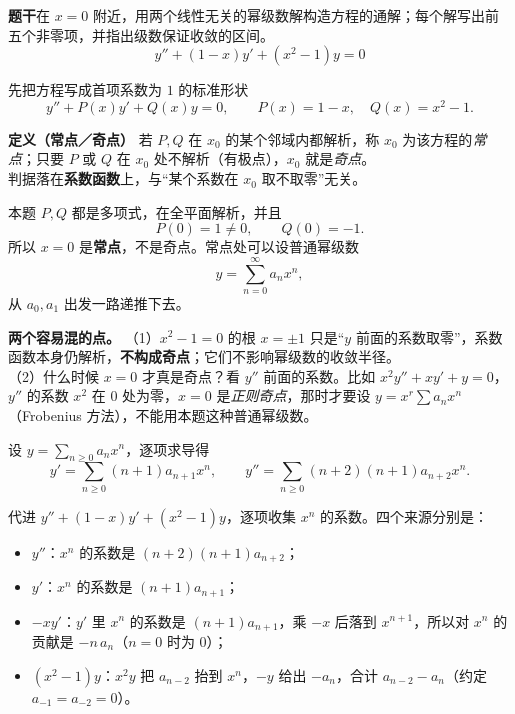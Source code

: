 ﻿\documentclass[11pt]{ctexart}
\renewcommand{\callout}[1]{\par\medskip\noindent
  \colorbox{bandviolet}{\parbox{0.955\linewidth}{\vspace{2pt}#1\vspace{2pt}}}%
  \par\medskip}
\renewcommand{\warnbox}[1]{\par\medskip\noindent
  \colorbox{bandcream}{\parbox{0.955\linewidth}{\vspace{2pt}#1\vspace{2pt}}}%
  \par\medskip}
\renewcommand{\qstem}[1]{\par\medskip\noindent
  \colorbox{bandviolet}{\parbox{0.955\linewidth}{\vspace{2pt}%
    {\small\bfseries\color{violet}题干}\hspace{0.8em}#1\vspace{2pt}}}%
  \par\medskip}
\begin{document}

\qstem{在 $x=0$ 附近，用两个线性无关的幂级数解构造方程的通解；每个解写出前五个非零项，并指出级数保证收敛的区间。
\[ y''+(1-x)y'+(x^2-1)y=0 \]}


先把方程写成首项系数为 $1$ 的标准形状
\[ y''+P(x)y'+Q(x)y=0,\qquad P(x)=1-x,\quad Q(x)=x^2-1 . \]

\callout{
\textbf{定义（常点／奇点）}\;
若 $P,Q$ 在 $x_0$ 的某个邻域内都解析，称 $x_0$ 为该方程的\emph{常点}；只要 $P$ 或 $Q$ 在 $x_0$ 处不解析（有极点），$x_0$ 就是\emph{奇点}。\\
判据落在\textbf{系数函数}上，与“某个系数在 $x_0$ 取不取零”无关。
}

本题 $P,Q$ 都是多项式，在全平面解析，并且
\[ P(0)=1\neq 0,\qquad Q(0)=-1 . \]
所以 $x=0$ 是\textbf{常点}，不是奇点。常点处可以设普通幂级数
\[ y=\sum_{n=0}^{\infty}a_nx^n , \]
从 $a_0,a_1$ 出发一路递推下去。

\warnbox{
\textbf{两个容易混的点。}
（1）$x^2-1=0$ 的根 $x=\pm1$ 只是“$y$ 前面的系数取零”，系数函数本身仍解析，\textbf{不构成奇点}；它们不影响幂级数的收敛半径。\\
（2）什么时候 $x=0$ 才真是奇点？看 $y''$ 前面的系数。比如 $x^2y''+xy'+y=0$，$y''$ 的系数 $x^2$ 在 $0$ 处为零，$x=0$ 是\emph{正则奇点}，那时才要设 $y=x^r\sum a_nx^n$（Frobenius 方法），不能用本题这种普通幂级数。
}



设 $y=\sum_{n\ge0}a_nx^n$，逐项求导得
\[ y'=\sum_{n\ge0}(n+1)a_{n+1}x^{n},\qquad
   y''=\sum_{n\ge0}(n+2)(n+1)a_{n+2}x^{n}. \]

代进 $y''+(1-x)y'+(x^2-1)y$，逐项收集 $x^n$ 的系数。四个来源分别是：

\begin{itemize}
\item $y''$：$x^n$ 的系数是 $(n+2)(n+1)a_{n+2}$；
\item $y'$：$x^n$ 的系数是 $(n+1)a_{n+1}$；
\item $-xy'$：$y'$ 里 $x^{n}$ 的系数是 $(n+1)a_{n+1}$，乘 $-x$ 后落到 $x^{n+1}$，所以对 $x^n$ 的贡献是 $-n\,a_n$（$n=0$ 时为 $0$）；
\item $(x^2-1)y$：$x^2y$ 把 $a_{n-2}$ 抬到 $x^n$，$-y$ 给出 $-a_n$，合计 $a_{n-2}-a_n$（约定 $a_{-1}=a_{-2}=0$）。
\end{itemize}
\end{document}
